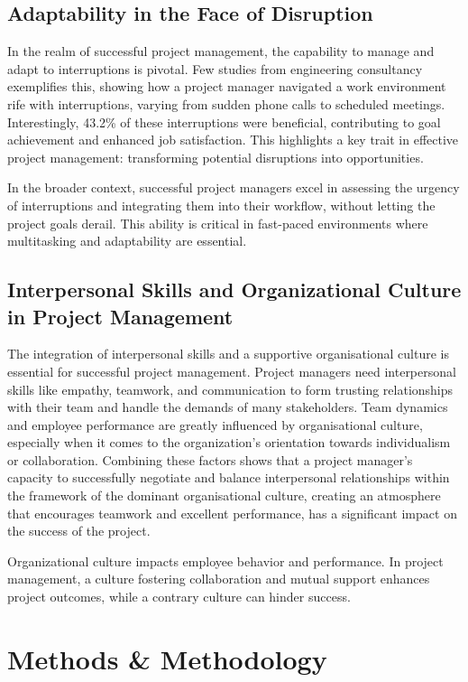 \documentclass{article}
\begin{document}
\subsection{Adaptability in the Face of Disruption}
In the realm of successful project management, the capability to manage and adapt to interruptions is pivotal. Few studies from engineering consultancy exemplifies this, showing how a project manager navigated a work environment rife with interruptions, varying from sudden phone calls to scheduled meetings. Interestingly, 43.2\% of these interruptions were beneficial, contributing to goal achievement and enhanced job satisfaction. This highlights a key trait in effective project management: transforming potential disruptions into opportunities.

In the broader context, successful project managers excel in assessing the urgency of interruptions and integrating them into their workflow, without letting the project goals derail. This ability is critical in fast-paced environments where multitasking and adaptability are essential. \cite{mordu2016managing}

\subsection{Interpersonal Skills and Organizational Culture in Project Management}
The integration of interpersonal skills and a supportive organisational culture is essential for successful project management. Project managers need interpersonal skills like empathy, teamwork, and communication to form trusting relationships with their team and handle the demands of many stakeholders. Team dynamics and employee performance are greatly influenced by organisational culture, especially when it comes to the organization's orientation towards individualism or collaboration. Combining these factors shows that a project manager's capacity to successfully negotiate and balance interpersonal relationships within the framework of the dominant organisational culture, creating an atmosphere that encourages teamwork and excellent performance, has a significant impact on the success of the project. \cite{nusari2018impact}

Organizational culture impacts employee behavior and performance. In project management, a culture fostering collaboration and mutual support enhances project outcomes, while a contrary culture can hinder success.


\section{Methods \& Methodology}
\end{document}
